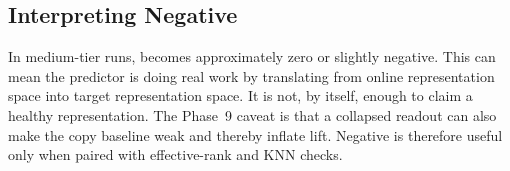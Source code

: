 \subsection{Interpreting Negative \copycos}

In medium-tier  runs, \copycos{} becomes
approximately zero or slightly negative.  This can mean the predictor is
doing real work by translating from online representation space into
target representation space.  It is not, by itself, enough to claim a
healthy representation.  The Phase~9 caveat is that a collapsed readout
can also make the copy baseline weak and thereby inflate lift.  Negative
\copycos{} is therefore useful only when paired with effective-rank and
KNN checks.
